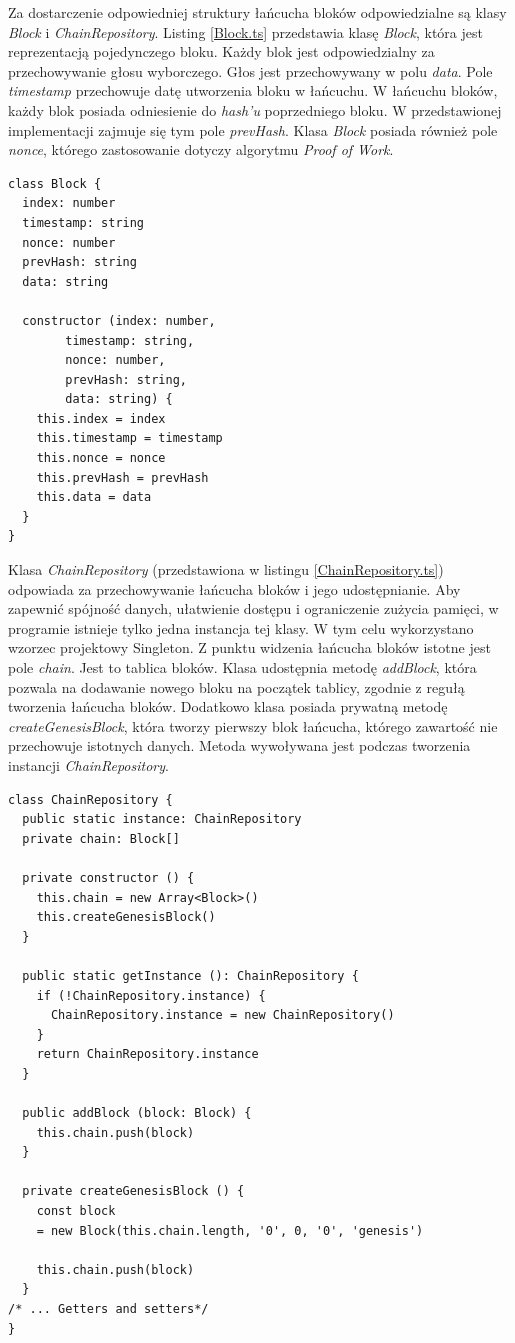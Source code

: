 \documentclass[a4paper,12pt]{book}
\begin{document}
Za dostarczenie odpowiedniej struktury łańcucha bloków odpowiedzialne są klasy \textit{Block} i \textit{ChainRepository}. Listing \ref{Block.ts} przedstawia klasę \textit{Block}, która jest reprezentacją pojedynczego bloku. Każdy blok jest odpowiedzialny za przechowywanie głosu wyborczego. Głos jest przechowywany w polu \textit{data}. Pole \textit{timestamp} przechowuje datę utworzenia bloku w łańcuchu. W łańcuchu bloków, każdy blok posiada odniesienie do \textit{hash'u} poprzedniego bloku. W przedstawionej implementacji zajmuje się tym pole \textit{prevHash}. Klasa \textit{Block} posiada również pole \textit{nonce}, którego zastosowanie dotyczy algorytmu \textit{Proof of Work}.

\newpage

\begin{lstlisting}[style=ES6, caption={Klasa \textit{Block}.},label={Block.ts}]
class Block {
  index: number
  timestamp: string
  nonce: number
  prevHash: string
  data: string

  constructor (index: number,
 		timestamp: string,
 		nonce: number,
 		prevHash: string,
	 	data: string) {
    this.index = index
    this.timestamp = timestamp
    this.nonce = nonce
    this.prevHash = prevHash
    this.data = data
  }
}
\end{lstlisting}

Klasa \textit{ChainRepository} (przedstawiona w listingu \ref{ChainRepository.ts}) odpowiada za przechowywanie łańcucha bloków i jego udostępnianie. Aby zapewnić spójność danych, ułatwienie dostępu i ograniczenie zużycia pamięci, w programie istnieje tylko jedna instancja tej klasy. W tym celu wykorzystano wzorzec projektowy Singleton. Z punktu widzenia łańcucha bloków istotne jest pole \textit{chain}. Jest to tablica bloków. Klasa udostępnia metodę \textit{addBlock}, która pozwala na dodawanie nowego bloku na początek tablicy, zgodnie z regułą tworzenia łańcucha bloków. Dodatkowo klasa posiada prywatną metodę \textit{createGenesisBlock}, która tworzy pierwszy blok łańcucha, którego zawartość nie przechowuje istotnych danych. Metoda wywoływana jest podczas tworzenia instancji \textit{ChainRepository}.

\newpage

\begin{lstlisting}[style=ES6, caption={Klasa \textit{ChainRepository}.}, label={ChainRepository.ts}]
class ChainRepository {
  public static instance: ChainRepository
  private chain: Block[]

  private constructor () {
    this.chain = new Array<Block>()
    this.createGenesisBlock()
  }

  public static getInstance (): ChainRepository {
    if (!ChainRepository.instance) {
      ChainRepository.instance = new ChainRepository()
    }
    return ChainRepository.instance
  }

  public addBlock (block: Block) {
    this.chain.push(block)
  }

  private createGenesisBlock () {
    const block 
	= new Block(this.chain.length, '0', 0, '0', 'genesis')

    this.chain.push(block)
  }
/* ... Getters and setters*/
}
\end{lstlisting}
\end{document}
